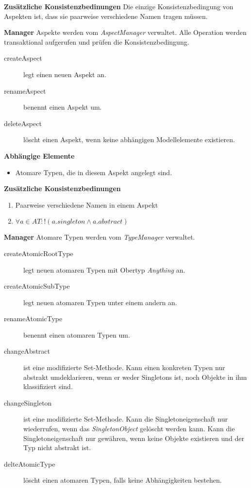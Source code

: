 
\textbf{Zusätzliche Konsistenzbedinungen} \newline
Die einzige Konsistenzbedingung von Aspekten ist, dass sie paarweise verschiedene Namen tragen müssen. 

\textbf{Manager} \newline
Aspekte werden vom \emph{AspectManager} verwaltet. Alle Operation werden transaktional aufgerufen und prüfen die Konsistenzbedingung. 

\begin{description}
\item[createAspect] legt einen neuen Aspekt an.
\item[renameAspect] benennt einen Aspekt um.
\item[deleteAspect] löscht einen Aspekt, wenn keine abhängigen Modellelemente existieren.
\end{description}

\textbf{Abhängige Elemente}
\begin{itemize}
	\item Atomare Typen, die in diesem Aspekt angelegt sind.
\end{itemize}

\newpage
{}

\textbf{Zusätzliche Konsistenzbedinungen}
\begin{enumerate}
  		\item Paarweise verschiedene Namen in einem Aspekt
  		\item \(\forall a \in AT : !(a.singleton \land a.abstract) \)
\end{enumerate}

\textbf{Manager} \newline
Atomare Typen werden vom \emph{TypeManager} verwaltet. 

\begin{description}
\item[createAtomicRootType] legt neuen atomaren Typen mit Obertyp \emph{Anything} an. 
\item[createAtomicSubType] legt neuen atomaren Typen unter einem andern an. 
\item[renameAtomicType] benennt einen atomaren Typen um. 
\item[changeAbstract] ist eine modifizierte Set-Methode. Kann einen konkreten Typen nur abstrakt umdeklarieren, wenn er weder Singletons ist, noch 
Objekte in ihm klassifiziert sind.
\item[changeSingleton] ist eine modifizierte Set-Methode. Kann die Singletoneigenschaft nur wiederrufen, wenn das \emph{SingletonObject} gelöscht werden kann. 
 Kann die Singletoneigenschaft nur gewähren, wenn keine Objekte existieren und der Typ nicht abstrakt ist. 
 \item[delteAtomicType] löscht einen atomaren Typen, falls keine Abhängigkeiten bestehen.
\end{description}

